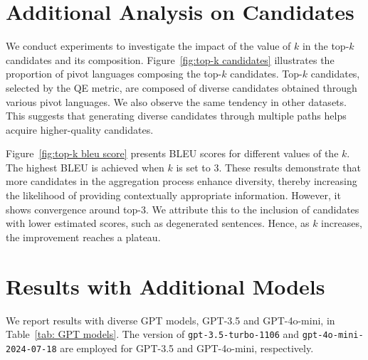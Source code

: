 \section{Additional Analysis on Candidates}
\label{apdx:selecting top-k}
We conduct experiments to investigate the impact of the value of $\textit{k}$ in the top-$\textit{k}$ candidates and its composition.
Figure~\ref{fig:top-k candidates} illustrates the proportion of pivot languages composing the top-$\textit{k}$ candidates.
Top-$\textit{k}$ candidates, selected by the QE metric, are composed of diverse candidates obtained through various pivot languages.
We also observe the same tendency in other datasets.
This suggests that generating diverse candidates through multiple paths helps acquire higher-quality candidates.


Figure~\ref{fig:top-k bleu score} presents BLEU scores for different values of the $\textit{k}$.
The highest BLEU is achieved when $k$ is set to 3.
These results demonstrate that more candidates in the aggregation process enhance diversity, thereby increasing the likelihood of providing contextually appropriate information.
However, it shows convergence around top-3.
We attribute this to the inclusion of candidates with lower estimated scores, such as degenerated sentences.
Hence, as $k$ increases, the improvement reaches a plateau.






\section{Results with Additional Models}
\label{apdx: Experiments with Additional Models}

We report results with diverse GPT models, GPT-3.5 and GPT-4o-mini, in Table~\ref{tab: GPT models}. 
The version of \texttt{gpt-3.5-turbo-1106} and \texttt{gpt-4o-mini-2024-07-18} are employed for GPT-3.5 and GPT-4o-mini, respectively.


